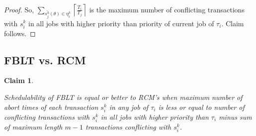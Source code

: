 \documentclass[12pt,english]{report}
\newtheorem{clm}{Claim}
\newtheorem{proof}{Proof}
\begin{document}
\begin{proof}
So, $\sum_{\bar{s_{j}^{h}}(\theta)\in\eta_{i}^{k}}\left\lceil \frac{T_{i}}{T_{j}}\right\rceil$
is the maximum number of conflicting transactions with $s_i^k$ in all jobs with higher priority than priority of current job of $\tau_{i}$. Claim follows.

\end{proof}

\subsection{FBLT vs. RCM}

\begin{clm}\label{clm:fblt_rcm}

Schedulability of FBLT is equal or better to RCM's when maximum number
of abort times of each transaction $s_{i}^{k}$ in any job of $\tau_{i}$
is less or equal to number of conflicting transactions with $s_{i}^{k}$
in all jobs with higher priority than $\tau_{i}$ minus sum of maximum
length $m-1$ transactions conflicting with $s_{i}^{k}$.

\end{clm}
\end{document}
